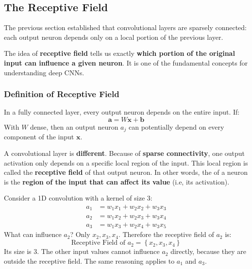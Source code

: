 \subsection{The Receptive Field}\label{sec:the-receptive-field}

The previous section established that convolutional layers are sparsely connected: each output neuron depends only on a local portion of the previous layer.

\highspace
The idea of \textbf{receptive field} tells us exactly \textbf{which portion of the original input can influence a given neuron}. It is one of the fundamental concepts for understanding deep CNNs.

\longline

\subsubsection{Definition of Receptive Field}\label{sec:definition-of-receptive-field}

In a fully connected layer, every output neuron depends on the entire input. If:
\begin{equation*}
    \mathbf{a} = W\mathbf{x} + \mathbf{b}
\end{equation*}
With $W$ dense, then an output neuron $a_j$ can potentially depend on every component of the input $\mathbf{x}$.

\highspace
A convolutional layer is \textbf{different}. Because of \textbf{sparse connectivity}, one output activation only depends on a specific local region of the input. This local region is called the \textbf{receptive field} of that output neuron. In other words, the  of a neuron is the \textbf{region of the input that can affect its value} (i.e, its activation).

\begin{examplebox}
    Consider a 1D convolution with a kernel of size 3:
    \begin{align*}
        a_1 &= w_1 x_1 + w_2 x_2 + w_3 x_3 \\
        a_2 &= w_1 x_2 + w_2 x_3 + w_3 x_4 \\
        a_3 &= w_1 x_3 + w_2 x_4 + w_3 x_5
    \end{align*}
    What can influence $a_2$? Only $x_2, x_3, x_4$. Therefore the receptive field of $a_2$ is:
    \begin{equation*}
        \text{Receptive Field of } a_2 = \left\{x_2, x_3, x_4\right\}
    \end{equation*}
    Its size is 3. The other input values cannot influence $a_2$ directly, because they are outside the receptive field. The same reasoning applies to $a_1$ and $a_3$.
\end{examplebox}

